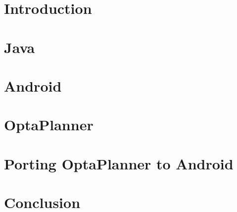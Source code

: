 \chapter{Introduction}


\chapter{Java}


\chapter{Android}\label{AndroidSec}


\chapter{OptaPlanner}


\chapter{Porting OptaPlanner to Android}


\chapter{Conclusion}


